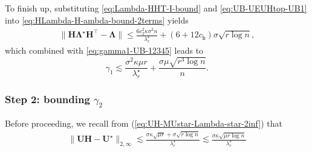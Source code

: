 To finish up, substituting \eqref{eq:Lambda-HHT-I-bound} and \eqref{eq:UB-UEUHtop-UB1} into \eqref{eq:HLambda-H-ambda-bound-2terms} yields
%
\begin{align}
	\big\|\bm{H}\bm{\Lambda}^{\star}\bm{H}^{\top}-\bm{\Lambda}\big\|\leq\frac{6c_{2}^2\kappa\sigma^{2}n}{\lambda_{r}^{\star}}+ (6+12c_{\mathsf{b}})\sigma\sqrt{r\log n} ,
	\label{eq:H-Lambda-star-H-Lambda-dist}
\end{align}
%
which combined with \eqref{eq:gamma1-UB-12345} leads to
%
\begin{equation}
\gamma_{1}\lesssim \frac{\sigma^{2} \kappa\mu r}{\lambda_{r}^{\star}}+\frac{\sigma\mu\sqrt{r^{3}\log n}}{n}.
\label{eq:gamma1-UB-2346}
\end{equation}
%



\subsubsection{Step 2: bounding $\gamma_2$}




Before proceeding, we recall from (\ref{eq:UH-MUstar-Lambda-star-2inf}) that
%
\begin{align}
	\big\|\bm{U}\bm{H}-\bm{U}^{\star}\big\|_{2,\infty}
	\lesssim  \frac{\sigma\kappa\sqrt{\mu r}+\sigma\sqrt{r\log n}}{\lambda_{r}^{\star}}
	\lesssim  \frac{\sigma\kappa\sqrt{\mu r \log n}}{\lambda_{r}^{\star}}
	\label{eq:UH-MUstar-Lambda-star-2inf-1}
\end{align}
%





